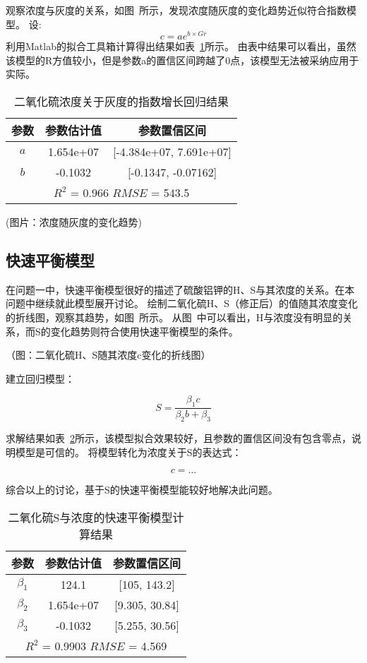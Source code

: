 观察浓度与灰度的关系，如图~所示，发现浓度随灰度的变化趋势近似符合指数模型。
设:
 $$c=ae^{b\times Gr}$$
利用Matlab的拟合工具箱计算得出结果如表~\ref{SO2_Gr_exp}所示。
由表中结果可以看出，虽然该模型的R方值较小，但是参数a的置信区间跨越了0点，该模型无法被采纳应用于实际。
\begin{table}[]
    \centering
    \caption{二氧化硫浓度关于灰度的指数增长回归结果}
    \label{SO2_Gr_exp}
    \begin{tabular}{@{}ccc@{}}
    \toprule
    参数       & 参数估计值      & 参数置信区间                   \\ \midrule
    $a$      & 1.654e+07     & {[}-4.384e+07, 7.691e+07{]}     \\
    $b$      &  -0.1032      & {[}-0.1347, -0.07162{]}       \\ \midrule
    \multicolumn{3}{c}{$R^2$ = 0.966 $RMSE$ = 543.5} \\ \bottomrule
    \end{tabular}
\end{table}


(图片：浓度随灰度的变化趋势)





\subsection{快速平衡模型}

在问题一中，快速平衡模型很好的描述了硫酸铝钾的H、S与其浓度的关系。在本问题中继续就此模型展开讨论。
绘制二氧化硫H、S（修正后）的值随其浓度变化的折线图，观察其趋势，如图~所示。
从图~中可以看出，H与浓度没有明显的关系，而S的变化趋势则符合使用快速平衡模型的条件。

（图：二氧化硫H、S随其浓度c变化的折线图）

建立回归模型：


   $$ S = \frac{\beta_1 c}{\beta_2b+\beta_3}$$


求解结果如表~\ref{SO2_S_MM}所示，该模型拟合效果较好，且参数的置信区间没有包含零点，说明模型是可信的。
将模型转化为浓度关于S的表达式：


    $$c = ...$$


综合以上的讨论，基于S的快速平衡模型能较好地解决此问题。

\begin{table}[]
    \centering
    \caption{二氧化硫S与浓度的快速平衡模型计算结果}
    \label{SO2_S_MM}
    \begin{tabular}{@{}ccc@{}}
    \toprule
    参数       & 参数估计值      & 参数置信区间                   \\ \midrule
    $\beta_1$      & 124.1     & {[}105, 143.2{]}     \\
    $\beta_2$      & 1.654e+07     & {[}9.305, 30.84{]}     \\
    $\beta_3$      &  -0.1032      & {[}5.255, 30.56{]}       \\ \midrule
    \multicolumn{3}{c}{$R^2$ = 0.9903 $RMSE$ = 4.569} \\ \bottomrule
    \end{tabular}
\end{table}
